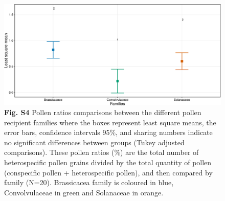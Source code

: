 \documentclass[12pt,]{article}
\begin{document}
\begin{figure}
\centering
\includegraphics{Supp_Material_files/figure-latex/unnamed-chunk-12-1.pdf}
\caption{\textbf{Fig. S4} Pollen ratios comparisons between the
different pollen recipient families where the boxes represent least
square means, the error bars, confidence intervals 95\%, and sharing
numbers indicate no significant differences between groups (Tukey
adjusted comparisons). These pollen ratios (\%) are the total number of
heterospecific pollen grains divided by the total quantity of pollen
(conspecific pollen + heterospecific pollen), and then compared by
family (N=20). Brassicacea family is coloured in blue, Convolvulaceae in
green and Solanaceae in orange.}
\end{figure}

\newpage
\end{document}
